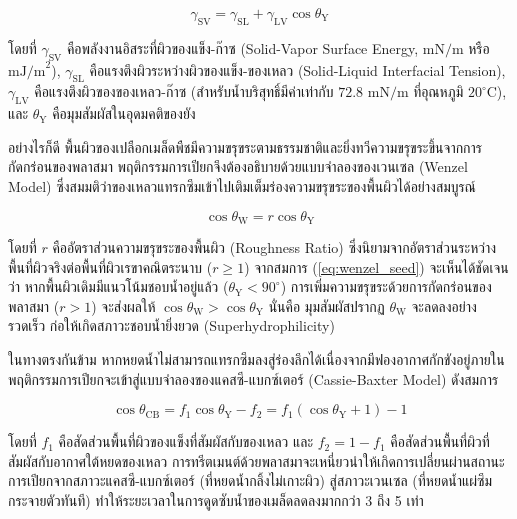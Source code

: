 \begin{equation}
    \gamma_{\text{SV}} = \gamma_{\text{SL}} + \gamma_{\text{LV}} \cos \theta_{\text{Y}}
    \label{eq:young_seed}
\end{equation}

โดยที่ $\gamma_{\text{SV}}$ คือพลังงานอิสระที่ผิวของแข็ง-ก๊าซ (Solid-Vapor Surface Energy, $\text{mN/m}$ หรือ $\text{mJ/m}^2$), $\gamma_{\text{SL}}$ คือแรงตึงผิวระหว่างผิวของแข็ง-ของเหลว (Solid-Liquid Interfacial Tension), $\gamma_{\text{LV}}$ คือแรงตึงผิวของของเหลว-ก๊าซ (สำหรับน้ำบริสุทธิ์มีค่าเท่ากับ $72.8 \text{ mN/m}$ ที่อุณหภูมิ $20^\circ\text{C}$), และ $\theta_{\text{Y}}$ คือมุมสัมผัสในอุดมคติของยัง

อย่างไรก็ดี พื้นผิวของเปลือกเมล็ดพืชมีความขรุขระตามธรรมชาติและยิ่งทวีความขรุขระขึ้นจากการกัดกร่อนของพลาสมา พฤติกรรมการเปียกจึงต้องอธิบายด้วยแบบจำลองของเวนเซล (Wenzel Model) ซึ่งสมมติว่าของเหลวแทรกซึมเข้าไปเติมเต็มร่องความขรุขระของพื้นผิวได้อย่างสมบูรณ์

\begin{equation}
    \cos \theta_{\text{W}} = r \cos \theta_{\text{Y}}
    \label{eq:wenzel_seed}
\end{equation}

โดยที่ $r$ คืออัตราส่วนความขรุขระของพื้นผิว (Roughness Ratio) ซึ่งนิยามจากอัตราส่วนระหว่างพื้นที่ผิวจริงต่อพื้นที่ผิวเรขาคณิตระนาบ ($r \ge 1$) จากสมการ (\ref{eq:wenzel_seed}) จะเห็นได้ชัดเจนว่า หากพื้นผิวเดิมมีแนวโน้มชอบน้ำอยู่แล้ว ($\theta_{\text{Y}} < 90^\circ$) การเพิ่มความขรุขระด้วยการกัดกร่อนของพลาสมา ($r > 1$) จะส่งผลให้ $\cos \theta_{\text{W}} > \cos \theta_{\text{Y}}$ นั่นคือ มุมสัมผัสปรากฏ $\theta_{\text{W}}$ จะลดลงอย่างรวดเร็ว ก่อให้เกิดสภาวะชอบน้ำยิ่งยวด (Superhydrophilicity)

ในทางตรงกันข้าม หากหยดน้ำไม่สามารถแทรกซึมลงสู่ร่องลึกได้เนื่องจากมีฟองอากาศกักขังอยู่ภายใน พฤติกรรมการเปียกจะเข้าสู่แบบจำลองของแคสซี-แบกซ์เตอร์ (Cassie-Baxter Model) ดังสมการ

\begin{equation}
    \cos \theta_{\text{CB}} = f_1 \cos \theta_{\text{Y}} - f_2 = f_1 (\cos \theta_{\text{Y}} + 1) - 1
    \label{eq:cassie_baxter}
\end{equation}

โดยที่ $f_1$ คือสัดส่วนพื้นที่ผิวของแข็งที่สัมผัสกับของเหลว และ $f_2 = 1 - f_1$ คือสัดส่วนพื้นที่ผิวที่สัมผัสกับอากาศใต้หยดของเหลว การทรีตเมนต์ด้วยพลาสมาจะเหนี่ยวนำให้เกิดการเปลี่ยนผ่านสถานะการเปียกจากสภาวะแคสซี-แบกซ์เตอร์ (ที่หยดน้ำกลิ้งไม่เกาะผิว) สู่สภาวะเวนเซล (ที่หยดน้ำแผ่ซึมกระจายตัวทันที) ทำให้ระยะเวลาในการดูดซับน้ำของเมล็ดลดลงมากกว่า 3 ถึง 5 เท่า

